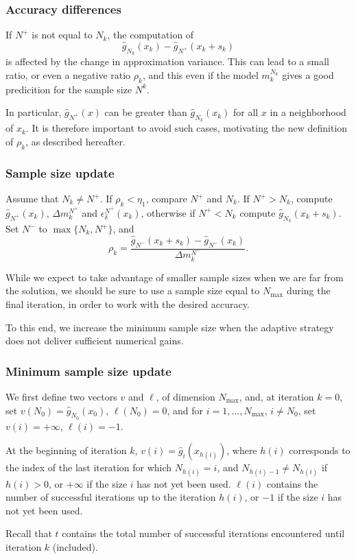 \documentclass{beamer}
\begin{document}
\begin{frame}
\frametitle{Accuracy differences}

If $N^+$ is not equal to $N_k$, the computation of
\[
 \hat{g}_{N_k} (x_k) - \hat{g}_{N^+} ( x_k + s_k )
\]
is affected by the change in approximation variance.
This can lead to a small ratio, or even a negative ratio $\rho_k$, and this even if the model $m_k^{N_k}$ gives a good predicition for the sample size $N^k$.

\mbox{}

In particular, $\hat{g}_{N^+}(x)$ can be greater than $\hat{g}_{N_k}(x_k)$ for all $x$ in a neighborhood of $x_k$.
It is therefore important to avoid such cases, motivating the new definition of $\rho_k$, as described hereafter.

\end{frame}

\begin{frame}
\frametitle{Sample size update}

Assume that $N_k \ne N^+$.
If $\rho_k < \eta_1$, compare $N^+$ and $N_k$.
If $N^+ > N_k$, compute $\hat{g}_{N^+}(x_k)$, $\Delta m_k^{N^+}$ and
$\epsilon_{\delta}^{N^+}(x_k)$, otherwise if $N^+ < N_k$ compute $\hat{g}_{N_k}(x_k + s_k)$.
Set $N^-$ to $\max\lbrace N_k, N^+ \rbrace$, and %
\[
\rho_k = \frac{\hat{g}_{N^-}(x_k+s_k) - \hat{g}_{N^-}(x_k)}{\Delta
m_k^{N^-}}.
\]

\mbox{}

While we expect to take advantage of smaller sample sizes when we are far from the solution, we should be sure to use a sample size equal to $N_{\max}$ during the final iteration, in order to work with the desired accuracy.

\mbox{}

To this end, we increase the minimum sample size when the adaptive strategy does not deliver sufficient numerical gains.

\end{frame}

\begin{frame}
\frametitle{Minimum sample size update}

We first define two vectors $v$ and $\ell$, of dimension $N_{\max}$, and, at iteration $k = 0$, set $v(N_0) = \hat{g}_{N_0}(x_0)$, $\ell(N_0) = 0$, and for $i =
1,\ldots,N_{\max}$, $i \ne N_0$, set $v(i) = +\infty$, $\ell(i) = -1$.

\mbox{}

At the beginning of iteration $k$, $v(i) = \hat{g}_i(x_{h(i)})$, where $h(i)$ corresponds to the index of the last iteration for which $N_{h(i)} = i$, and $N_{h(i)-1} \ne N_{h(i)}$ if $h(i) > 0$, or $+\infty$ if the size $i$ has not yet been used.
$\ell(i)$ contains the number of successful iterations up to the iteration $h(i)$, or $-1$ if the size $i$ has not yet been used.

\mbox{}

Recall that $t$ contains the total number of successful iterations encountered until iteration $k$ (included).

\end{frame}
\end{document}
